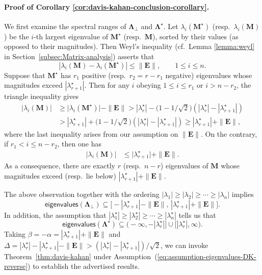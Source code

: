 \paragraph{Proof of Corollary \ref{cor:davis-kahan-conclusion-corollary}.}
We first examine the spectral ranges of $\bm{\Lambda}_{\perp}$ and $\bm{\Lambda}^{\star}$.
Let $\lambda_i(\bm{M}^{\star})$ (resp.~$\lambda_i(\bm{M})$) be the $i$-th largest eigenvalue of $\bm{M}^{\star}$ (resp.~$\bm{M}$), sorted by their values (as opposed to their magnitudes). Then Weyl's inequality (cf.~Lemma \ref{lemma:weyl} in Section~\ref{subsec:Matrix-analysis}) asserts that
%
\[
	|\lambda_{i}(\bm{M})-\lambda_{i}(\bm{M}^{\star})|  \leq\|\bm{E}\|, \qquad 1\leq i\leq n.
\]
%
Suppose that $\bm{M}^{\star}$ has $r_1$ positive (resp.~$r_2=r-r_1$ negative) eigenvalues whose magnitudes exceed $|\lambda_{r+1}^{\star}|$.
Then for any $i$ obeying $1\leq i\leq r_{1}$ or $i>n-r_{2}$, the triangle inequality gives
%
\begin{align*}
\big|\lambda_{i}(\bm{M})\big| & \geq\big|\lambda_{i}(\bm{M}^{\star})\big|-\|\bm{E}\|>|\lambda_{r}^{\star}|-\big(1-1/\sqrt{2}\big)(|\lambda_{r}^{\star}|-|\lambda_{r+1}^{\star}|)\\
 & > |\lambda_{r+1}^{\star}|+\big(1-1/\sqrt{2}\big)(|\lambda_{r}^{\star}|-|\lambda_{r+1}^{\star}|)\geq|\lambda_{r+1}^{\star}|+\|\bm{E}\|,
\end{align*}
%
where the last inequality arises from our assumption on $\|\bm{E}\|$.
On the contrary, if $r_1 < i \leq n-r_2$, then one has
%
\begin{align*}
	\big|\lambda_{i}(\bm{M})\big| & \leq  \big|\lambda_{r+1}^{\star}\big| + \|\bm{E}\| .
\end{align*}
%
As a consequence, there are exactly $r$ (resp.~$n-r$) eigenvalues of $\bm{M}$ whose magnitudes exceed (resp.~lie below) $|\lambda_{r+1}^{\star}|+\|\bm{E}\|$.


The above observation together with the ordering $|\lambda_1 | \geq |\lambda_2 | \geq \cdots \geq |\lambda_n|$ implies
\[
\mathsf{eigenvalues}(\bm{\Lambda}_{\perp}) \subseteq \big[-|\lambda_{r+1}^{\star}|-\|\bm{E}\|, \, |\lambda_{r+1}^{\star}|+ \|\bm{E}\| \big].
\]
%
In addition, the assumption that $|\lambda_1^{\star} | \geq |\lambda_2^{\star} | \geq \cdots \geq |\lambda_n^{\star}|$ tells us that
\[
\mathsf{eigenvalues}(\bm{\Lambda}^{\star}) \subseteq \big(-\infty, -|\lambda_{r}^{\star}| \big] \cup \big[|\lambda_{r}^{\star}|, \infty\big).
\]
Taking $\beta = -\alpha= |\lambda_{r+1}^{\star}|+ \|\bm{E}\|$ and $\Delta=|\lambda_{r}^\star| -|\lambda_{r+1}^{\star}| - \|\bm{E}\| > (|\lambda_{r}^\star|-|\lambda_{r+1}^{\star}|) / \sqrt{2}$,
we can invoke Theorem~\ref{thm:davis-kahan} under Assumption~(\ref{eq:assumption-eigenvalues-DK-reverse}) to establish the advertised results.




